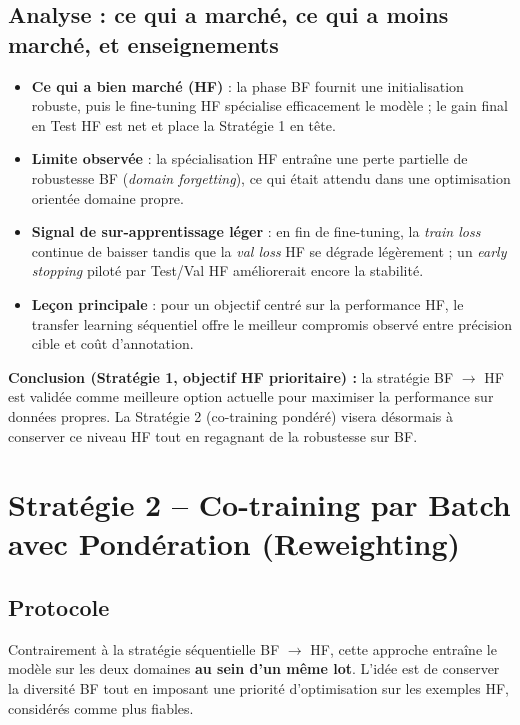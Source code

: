 \documentclass[11pt,a4paper,openany]{book}
\begin{document}
\subsection{Analyse : ce qui a marché, ce qui a moins marché, et enseignements}

\begin{itemize}
  \item \textbf{Ce qui a bien marché (HF)} : la phase BF fournit une initialisation robuste, puis le fine-tuning HF spécialise efficacement le modèle ; le gain final en Test HF est net et place la Stratégie 1 en tête.
  \item \textbf{Limite observée} : la spécialisation HF entraîne une perte partielle de robustesse BF (\textit{domain forgetting}), ce qui était attendu dans une optimisation orientée domaine propre.
  \item \textbf{Signal de sur-apprentissage léger} : en fin de fine-tuning, la \textit{train loss} continue de baisser tandis que la \textit{val loss} HF se dégrade légèrement ; un \textit{early stopping} piloté par Test/Val HF améliorerait encore la stabilité.
  \item \textbf{Leçon principale} : pour un objectif centré sur la performance HF, le transfer learning séquentiel offre le meilleur compromis observé entre précision cible et coût d'annotation.
\end{itemize}

\begin{decisionbox}
  \textbf{Conclusion (Stratégie 1, objectif HF prioritaire) :} la stratégie BF $\rightarrow$ HF est validée comme meilleure option actuelle pour maximiser la performance sur données propres. La Stratégie 2 (co-training pondéré) visera désormais à conserver ce niveau HF tout en regagnant de la robustesse sur BF.
\end{decisionbox}

\section{Stratégie 2 -- Co-training par Batch avec Pondération (Reweighting)}

\subsection{Protocole}

Contrairement à la stratégie séquentielle BF $\rightarrow$ HF, cette approche entraîne le modèle sur les deux domaines \textbf{au sein d'un même lot}. L'idée est de conserver la diversité BF tout en imposant une priorité d'optimisation sur les exemples HF, considérés comme plus fiables.
\end{document}
